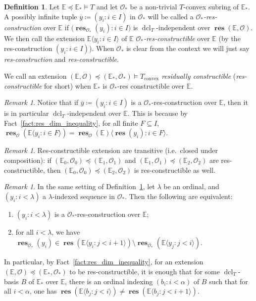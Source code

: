 \documentclass{amsart}
\theoremstyle{remark}
\newtheorem{remark}[theorem]{Remark}
\theoremstyle{definition}
\newtheorem{definition}[theorem]{Definition}
\theoremstyle{plain}
\newcommand{\bE}{\mathbb E}
\newcommand{\cO}{\mathcal O}
\newcommand{\convex}{\mathrm{convex}}
\DeclareMathOperator{\res}{\mathbf{res}}
\DeclareMathOperator{\dcl}{\mathrm{dcl}}
\theoremstyle{plain}
\begin{document}
\begin{definition}\label{def:res_constructible}
	Let $\bE \preceq \bE_*\models T$ and let $\cO_*$ be a non-trivial $T$-convex subring of $\bE_*$. A possibly infinite tuple $\overline{y}\coloneqq (y_i: i\in I)$ in $\cO_*$ will be called a \emph{$\mathcal{O}_*$-res-construction} over $\bE$ if $\big(\res_{\mathcal{O}_*}(y_i): i \in I\big)$ is $\dcl_T$-independent over $\res(\bE, \cO)$. We then call the extension $\bE \langle y_i :i \in I \rangle$ of $\bE$ \emph{$\cO_*$-res-constructible} over $\bE$ (by the res-construction $(y_i: i \in I)$). When $\mathcal{O}_*$ is clear from the context we will just say \emph{res-construction} and \emph{res-constructible}.

 	We call an extension $(\bE,\cO) \preceq (\bE_*, \cO_*) \models T_\convex$ \emph{residually constructible} (\emph{res-constructible} for short) when $\bE_*$ is $\cO_*$-res constructible over $\bE$.
\end{definition}

\begin{remark}\label{rmk:res-constructions_are_independent}
    Notice that if $\overline{y}\coloneqq (y_i: i\in I)$ is a $\cO_*$-res-construction over $\bE$, then it is in particular $\dcl_T$-independent over $\bE$. This is because by Fact~\ref{fact:res_dim_inequality}, for all finite $F\subseteq I$, $\res_{\cO}(\bE \langle y_i:i \in F\rangle)=\res_{\cO}(\bE) \langle \res(y_i): i \in F\rangle$.
\end{remark}

\begin{remark}\label{rmk:res-constructions_transitive}
    Res-constructible extension are transitive (i.e.\ closed under composition): if $(\bE_0 , \cO_0) \preceq (\bE_1, \cO_1)$ and $(\bE_1, \cO_1)\preceq (\bE_2, \cO_2)$ are res-constructible, then $(\bE_0, \cO_0) \preceq (\bE_2, \cO_2)$ is res-constructible as well.
\end{remark}

\begin{remark}\label{rmk:res-constructibility_and_basis_orderings}
    In the same setting of Definition~\ref{def:res_constructible}, let $\lambda$ be an ordinal, and $(y_i: i <\lambda)$ a $\lambda$-indexed sequence in $\cO_*$. Then the following are equivalent:
    \begin{enumerate}
        \item $(y_i: i<\lambda)$ is a $\mathcal{O}_*$-res-construction over $\bE$;
        \item for all $i<\lambda$, we have $\res_{\cO_*}(y_i) \in \res(\bE \langle y_i: j < i+1\rangle) \setminus \res_{\cO_*}(\bE \langle y_j: j< i\rangle)$.
    \end{enumerate}
    In particular, by Fact~\ref{fact:res_dim_inequality}, for an extension $(\bE, \cO) \preceq (\bE_*, \cO_*)$ to be res-constructible, it is enough that for some $\dcl_T$-basis $B$ of $\bE_*$ over $\bE$, there is an ordinal indexing $(b_i:i <\alpha)$ of $B$ such that for all $i<\alpha$, one has $\res(\bE\langle b_j: j < i \rangle) \neq \res(\bE \langle b_j: j < i+1 \rangle)$.
\end{remark}
\end{document}
